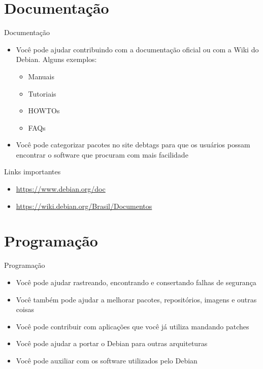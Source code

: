 \documentclass[10pt, compress, aspectratio=169]{beamer}
\begin{document}
\section{Documentação}

\begin{frame}{Documentação}
  \begin{itemize}
    \item Você pode ajudar contribuindo com a documentação oficial ou com
          a Wiki do Debian. Alguns exemplos:
      \begin{itemize}
        \item Manuais
        \item Tutoriais
        \item HOWTOs
        \item FAQs
      \end{itemize}
    \item Você pode categorizar pacotes no site debtags para que os usuários
          possam encontrar o software que procuram com mais facilidade
  \end{itemize}

  \begin{exampleblock}{Links importantes}
    \begin{itemize}
      \item \url{https://www.debian.org/doc}
      \item \url{https://wiki.debian.org/Brasil/Documentos}
    \end{itemize}
  \end{exampleblock}
\end{frame}

\section{Programação}

\begin{frame}{Programação}
  \begin{itemize}
    \item Você pode ajudar rastreando, encontrando e consertando falhas de
          segurança
    \item Você também pode ajudar a melhorar pacotes, repositórios, imagens e
          outras coisas
    \item Você pode contribuir com aplicações que você já utiliza mandando
          patches
    \item Você pode ajudar a portar o Debian para outras arquiteturas
    \item Você pode auxiliar com os software utilizados pelo Debian
  \end{itemize}
\end{frame}
\end{document}
